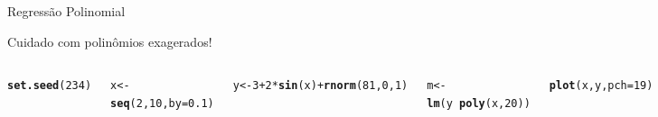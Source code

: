\documentclass{beamer}\usepackage[]{graphicx}\usepackage[]{color}
\makeatletter
\newcommand{\hlnum}[1]{\textcolor[rgb]{0.686,0.059,0.569}{#1}}%
\newcommand{\hlstr}[1]{\textcolor[rgb]{0.192,0.494,0.8}{#1}}%
\newcommand{\hlopt}[1]{\textcolor[rgb]{0,0,0}{#1}}%
\newcommand{\hlstd}[1]{\textcolor[rgb]{0.345,0.345,0.345}{#1}}%
\newcommand{\hlkwb}[1]{\textcolor[rgb]{0.69,0.353,0.396}{#1}}%
\newcommand{\hlkwc}[1]{\textcolor[rgb]{0.333,0.667,0.333}{#1}}%
\newcommand{\hlkwd}[1]{\textcolor[rgb]{0.737,0.353,0.396}{\textbf{#1}}}%
\newenvironment{kframe}{%
 \def\at@end@of@kframe{}%
 \ifinner\ifhmode%
  \def\at@end@of@kframe{\end{minipage}}%
  \begin{minipage}{\columnwidth}%
 \fi\fi%
 \def\FrameCommand##1{\hskip\@totalleftmargin \hskip-\fboxsep
 \colorbox{shadecolor}{##1}\hskip-\fboxsep
     \hskip-\linewidth \hskip-\@totalleftmargin \hskip\columnwidth}%
 \MakeFramed {\advance\hsize-\width
   \@totalleftmargin\z@ \linewidth\hsize
   \@setminipage}}%
 {\par\unskip\endMakeFramed%
 \at@end@of@kframe}
\newenvironment{knitrout}{}{} %
\renewenvironment{knitrout}{\setlength{\topsep}{0mm}}{}
\makeatother
\begin{document}
\begin{frame}[fragile]{Regressão Polinomial}

 Cuidado com polinômios exagerados!

\begin{columns}

\setlength{\topsep}{2pt}
\begin{knitrout}\tiny
{}\color{fgcolor}\begin{kframe}
\begin{alltt}
\hlkwd{set.seed}\hlstd{(}\hlnum{234}\hlstd{)}

\hlstd{x} \hlkwb{<-} \hlkwd{seq}\hlstd{(}\hlnum{2}\hlstd{,}\hlnum{10}\hlstd{,}\hlkwc{by}\hlstd{=}\hlnum{0.1}\hlstd{)}

\hlstd{y} \hlkwb{<-} \hlnum{3} \hlopt{+} \hlnum{2}\hlopt{*}\hlkwd{sin}\hlstd{(x)} \hlopt{+} \hlkwd{rnorm}\hlstd{(}\hlnum{81}\hlstd{,}\hlnum{0}\hlstd{,}\hlnum{1}\hlstd{)}

\hlstd{m} \hlkwb{<-} \hlkwd{lm}\hlstd{(y} \hlopt{~} \hlkwd{poly}\hlstd{(x,}\hlnum{20}\hlstd{))}

\hlkwd{plot}\hlstd{(x,y,} \hlkwc{pch}\hlstd{=}\hlnum{19}\hlstd{)}

\hlstd{xnovo} \hlkwb{<-} \hlkwd{data.frame}\hlstd{(} \hlkwc{x} \hlstd{=} \hlkwd{seq}\hlstd{(}\hlnum{2}\hlstd{,}\hlnum{10}\hlstd{,}\hlkwc{by}\hlstd{=}\hlnum{0.1}\hlstd{))}

\hlstd{p} \hlkwb{<-} \hlkwd{predict}\hlstd{(m,xnovo)}

\hlkwd{lines}\hlstd{(xnovo[,}\hlnum{1}\hlstd{],p,} \hlkwc{lwd}\hlstd{=}\hlnum{2}\hlstd{,}\hlkwc{col}\hlstd{=}\hlstr{'red'}\hlstd{)}
\end{alltt}
\end{kframe}
\end{knitrout}



\end{columns}
\end{frame}
\end{document}
